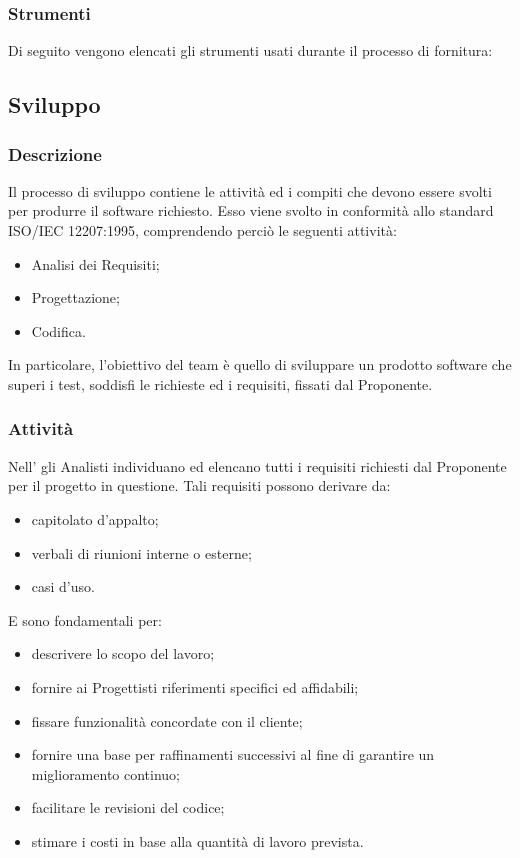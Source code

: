         \subsubsection{Strumenti}
        Di seguito vengono elencati gli strumenti usati durante il processo di fornitura:
        
	\subsection{Sviluppo}
		\subsubsection{Descrizione}
		Il processo di sviluppo contiene le attività ed i compiti che devono essere svolti per produrre il software richiesto. Esso viene svolto in conformità allo standard ISO/IEC 12207:1995, comprendendo perciò le seguenti attività:
		\begin{itemize}
			\item{Analisi dei Requisiti;}
			\item{Progettazione;}
			\item{Codifica.}
		\end{itemize}
		
		In particolare, l'obiettivo del team è quello di sviluppare un prodotto software che superi i test, soddisfi le richieste ed i requisiti, fissati dal Proponente.
        
        \subsubsection{Attività}
           	Nell'\AdR{} gli Analisti individuano ed elencano tutti i requisiti richiesti dal Proponente per il progetto in questione. Tali requisiti possono derivare da:
	        \begin{itemize}
	           		\item{capitolato d'appalto;}
					\item{verbali di riunioni interne o esterne;}
					\item{casi d'uso.}
	    	\end{itemize}
           	
           	E sono fondamentali per:
            \begin{itemize}
        		\item{descrivere lo scopo del lavoro;}
				\item{fornire ai Progettisti riferimenti specifici ed affidabili;}
				\item{fissare funzionalità concordate con il cliente;}
				\item{fornire una base per raffinamenti successivi al fine di garantire un miglioramento continuo;}
				\item{facilitare le revisioni del codice;}
				\item{stimare i costi in base alla quantità di lavoro prevista.}
        	\end{itemize}                 
             
